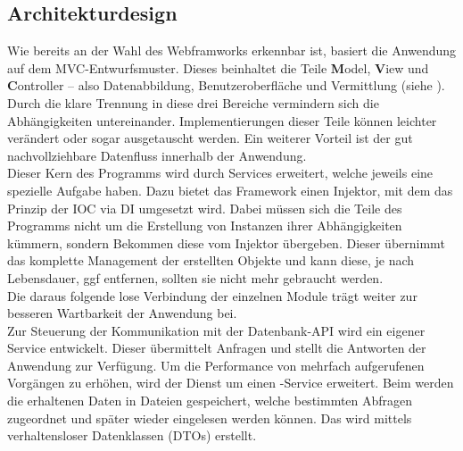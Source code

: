 \subsection{Architekturdesign}
\label{sec:Architekturdesign}
Wie bereits an der Wahl des Webframworks erkennbar ist, basiert die Anwendung auf dem \acs{MVC}-Entwurfsmuster.
Dieses beinhaltet die Teile \textbf{M}odel, \textbf{V}iew und \textbf{C}ontroller -- also Datenabbildung, 
Benutzeroberfläche und Vermittlung (siehe ). Durch die klare Trennung in diese drei Bereiche vermindern sich
die Abhängigkeiten untereinander. Implementierungen dieser Teile können leichter verändert oder sogar ausgetauscht werden.
Ein weiterer Vorteil ist der gut nachvollziehbare Datenfluss innerhalb der Anwendung.\\
Dieser Kern des Programms wird durch Services erweitert, welche jeweils eine spezielle Aufgabe haben.
Dazu bietet das Framework einen Injektor, mit dem das Prinzip der \ac{IOC} via 
\ac{DI} umgesetzt wird. Dabei müssen sich die Teile des Programms nicht um die Erstellung von
Instanzen ihrer Abhängigkeiten kümmern, sondern Bekommen diese vom Injektor übergeben. Dieser übernimmt
das komplette Management der erstellten Objekte und kann diese, je nach Lebensdauer, \acs{ggf} entfernen, sollten sie nicht mehr 
gebraucht werden.\\ 
Die daraus folgende lose Verbindung der einzelnen Module trägt 
weiter zur besseren Wartbarkeit der Anwendung bei.\\
Zur Steuerung der Kommunikation mit der Datenbank-\acs{API} wird ein eigener Service entwickelt. Dieser übermittelt
Anfragen und stellt die Antworten der Anwendung zur Verfügung. Um die Performance von
mehrfach aufgerufenen Vorgängen zu erhöhen, wird der Dienst um einen -Service erweitert.
Beim  werden die erhaltenen Daten in Dateien gespeichert, welche bestimmten Abfragen
zugeordnet und später wieder eingelesen werden können.
Das  wird mittels verhaltensloser Datenklassen (\acs{DTO}s) erstellt. 

